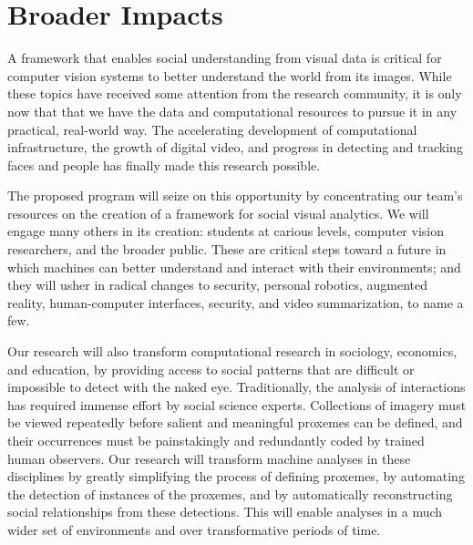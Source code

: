 %


\vspace{-8pt}
\section{Broader Impacts}
\label{sec:impacts}
\vspace{-8pt}
A framework that enables social understanding from visual data is critical for computer vision systems to better understand the world from its images. While these topics have received some attention from the research community, it is only now that that we have the data and computational resources to pursue it in any practical, real-world way. The accelerating development of computational infrastructure, the growth of digital video, and progress in detecting and tracking faces and people has finally made this research possible.

The proposed program will seize on this opportunity by concentrating our team's resources on the creation of a framework for social visual analytics. We will engage many others in its creation: students at carious levels, computer vision researchers, and the broader public. These are critical steps toward a future in which machines can better understand and interact with their environments; and they will usher in radical changes to security, personal robotics, augmented reality, human-computer interfaces, security, and video summarization, to name a few.

Our research will also transform computational research in sociology, economics, and education, by providing access to social patterns that are difficult or impossible to detect with the naked eye. Traditionally, the analysis of interactions has required immense effort by social science experts. Collections of imagery must be viewed repeatedly before salient and meaningful proxemes can be defined, and their occurrences must be painstakingly and redundantly coded by trained human observers. Our research will transform machine analyses in these disciplines by greatly simplifying the process of defining proxemes, by automating the detection of instances of the proxemes, and by automatically reconstructing social relationships from these detections. This will enable analyses in a much wider set of environments and over transformative periods of time.

